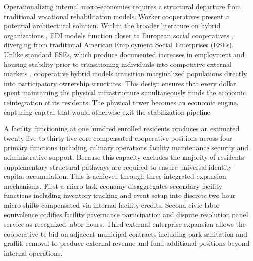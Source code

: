 \documentclass[12pt, letterpaper]{article}
\begin{document}
Operationalizing internal micro-economies requires a structural departure from traditional vocational rehabilitation models. Worker cooperatives present a potential architectural solution. Within the broader literature on hybrid organizations \citep{battilana2014advancing}, EDI models function closer to European social cooperatives \citep{defourny2010conceptions, galera2009social}, diverging from traditional American Employment Social Enterprises (ESEs). Unlike standard ESEs, which produce documented increases in employment and housing stability prior to transitioning individuals into competitive external markets \citep{rotz2015economic}, cooperative hybrid models transition marginalized populations directly into participatory ownership structures. This design ensures that every dollar spent maintaining the physical infrastructure simultaneously funds the economic reintegration of its residents. The physical tower becomes an economic engine, capturing capital that would otherwise exit the stabilization pipeline.

A facility functioning at one hundred enrolled residents produces an estimated twenty-five to thirty-five core compensated cooperative positions across four primary functions including culinary operations facility maintenance security and administrative support. Because this capacity excludes the majority of residents supplementary structural pathways are required to ensure universal identity capital accumulation. This is achieved through three integrated expansion mechanisms. First a micro-task economy disaggregates secondary facility functions including inventory tracking and event setup into discrete two-hour micro-shifts compensated via internal facility credits. Second civic labor equivalence codifies facility governance participation and dispute resolution panel service as recognized labor hours. Third external enterprise expansion allows the cooperative to bid on adjacent municipal contracts including park sanitation and graffiti removal to produce external revenue and fund additional positions beyond internal operations.
\end{document}
